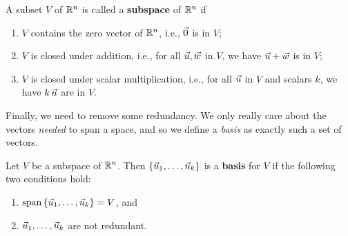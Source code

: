 \documentclass{ximera}
\begin{document}
\begin{exploration}
\begin{definition}
  A subset $V$ of $\mathbb{R}^n$ is called a \textbf{subspace}%
  of $\mathbb{R}^n$ if
  \begin{enumerate}
  \item $V$ contains the zero vector of $\mathbb{R}^n$, i.e., $\vec{0}$ is in $V$;
  \item $V$ is closed under addition, i.e., for all
    $\vec{u},\vec{w}$ in $V$, we have $\vec{u}+\vec{w}$ is in $V$;
  \item $V$ is closed under scalar multiplication, i.e., for all
    $\vec{u}$ in $V$ and scalars $k$, we have $k\,\vec{u}$ are in $V$.
  \end{enumerate}
\end{definition}

Finally, we need to remove some redundancy. We only really care about the vectors \emph{needed} to span a space, and so we define a \emph{basis} as exactly such a set of vectors.

\begin{definition}
  Let $V$ be a subspace of\/ $\mathbb{R}^n$. Then
  $\left\{\vec{u}_1,\ldots,\vec{u}_k\right\}$ is a \textbf{basis} for
  $V$ if the following two conditions hold:%
  \begin{enumerate}
  \item $\text{span}\left\{\vec{u}_1,\ldots,\vec{u}_k\right\}=V$, and
  \item $\vec{u}_1,\ldots,\vec{u}_k$ are not redundant.
  \end{enumerate}
\end{definition}



\end{exploration}
\end{document}

